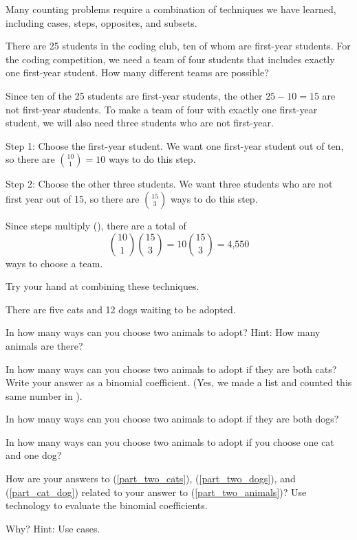 Many counting problems require a combination of techniques we have learned, including cases, steps, opposites, and subsets.  

\begin{exam}
\label{exam_team_leader}   
    There are 25 students in the coding club, ten of whom are first-year students.  For the coding competition, we need a team of four students that includes exactly one first-year student.  How many different teams are possible?
    \begin{soln}
        Since ten of the 25 students are first-year students, the other $25-10=15$ are not first-year students.  To make a team of four with exactly one first-year student, we will also need three students who are not first-year.

        Step 1: Choose the first-year student.  We want one first-year student out of ten, so there are $\binom{10}{1} = 10$ ways to do this step.

        Step 2: Choose the other three students.  We want three students who are not first year out of 15, so there are $\binom{15}{3}$ ways to do this step.

        Since steps multiply (), there are a total of 
        $$\binom{10}{1}\binom{15}{3} = 10\binom{15}{3} = \text{4,550}$$
        ways to choose a team.        
    \end{soln}
\end{exam}

Try your hand at combining these techniques. 

\begin{act} 
\label{act_adopting_two_animals}  
There are five cats and 12 dogs waiting to be adopted.
    \begin{actpart}
        \item \label{part_two_animals} In how many ways can you choose two animals to adopt?  Hint: How many animals are there?
        \item \label{part_two_cats} In how many ways can you choose two animals to adopt if they are both cats? Write your answer as a binomial coefficient.  (Yes, we made a list and counted this same number in ).
        \item \label{part_two_dogs} In how many ways can you choose two animals to adopt if they are both dogs?
        \item \label{part_cat_dog} In how many ways can you choose two animals to adopt if you choose one cat and one dog?
        \item How are your answers to (\ref{part_two_cats}), (\ref{part_two_dogs}), and (\ref{part_cat_dog}) related to your answer to (\ref{part_two_animals})?  Use technology to evaluate the binomial coefficients.
        \item Why?  Hint: Use cases. \end{actpart}
\end{act}

